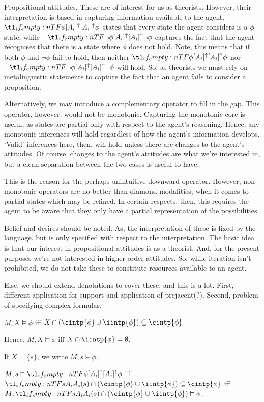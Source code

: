 \documentclass[10pt]{article}
\begin{document}
\begin{note}
  Propositional attitudes.
  These are of interest for us as theorists.
  However, their interpretation is based in capturing information available to the agent.
  \(\lattu{\phi}\) states that every state the agent considers is a \(\phi\) state, while \(\lnot\lattu{\lnot\phi}\) captures the fact that the agent recognises that there is a state where \(\phi\) does not hold.
  Note, this means that if both \(\phi\) and \(\lnot\phi\) fail to hold, then neither \(\lattu{\phi}\) nor \(\lnot\lattu{\lnot\phi}\) will hold.
  So, as theorists we must rely on metalinguistic statements to capture the fact that an agent fails to consider a proposition.

  Alternatively, we may introduce a complementary operator to fill in the gap.
  This operator, however, would not be monotonic.
  Capturing the monotonic core is useful, as states are partial only with respect to the agent's reasoning.
  Hence, any monotonic inferences will hold regardless of how the agent's information develops.
  `Valid' inferences here, then, will hold unless there are changes to the agent's attitudes.
  Of course, changes to the agent's attitudes are what we're interested in, but a clean separation between the two cases is useful to have.

  This is the reason for the perhaps unintuitive downward operator.
  However, non-monotonic operators are no better than diamond modalities, when it comes to partial states which may be refined.
  In certain respects, then, this requires the agent to be aware that they only have a partial representation of the possibilities.
\end{note}



Belief and desires should be noted.
As, the interpretation of these is fixed by the language, but is only specified with respect to the interpretation.
The basic idea is that our interest in propositional attitudes is as a theorist.
And, for the present purposes we're not interested in higher order attitudes.
So, while iteration isn't prohibited, we do not take these to constitute resources available to an agent.

Else, we should extend denotations to cover these, and this is a lot.
First, different application for support and application of prejacent(?).
Second, problem of specifying complex formulas.

\begin{definition}[Support]
  \(M,X \vDash \phi\) iff \(X \cap (\cintp{\phi} \cup \iintp{\phi}) \subseteq \cintp{\phi}\).

  Hence, \(M,X \vDash \phi\) iff \(X \cap \iintp{\phi} = \emptyset\).

  If \(X = \{s\}\), we write \(M,s \vDash \phi\).

  \(M,s \vDash \lattu{\phi}\) iff \(\fatt{s} \cap (\cintp{\phi} \cup \iintp{\phi}) \subseteq \cintp{\phi}\) iff \(M,\fatt{s} \cap (\cintp{\phi} \cup \iintp{\phi}) \vDash \phi\).
\end{definition}
\end{document}
